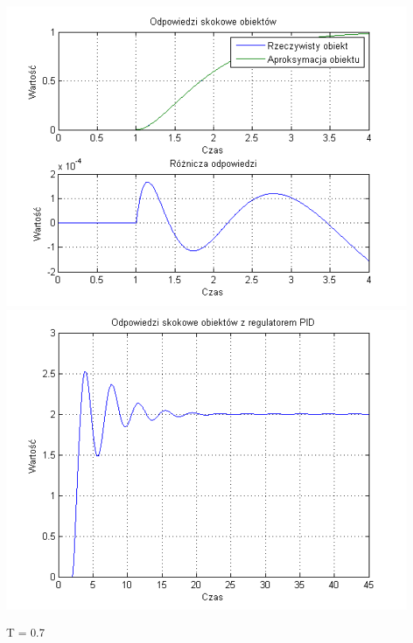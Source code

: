 \documentclass[10pt,a4paper]{article}
\begin{document}
\begin{center}
\includegraphics[scale=1]{images/dwa/skrypt_55.png}\\
\includegraphics[scale=1]{images/dwa/skrypt_56.png}\\
\end{center}
\newpage
T = 0.7
\end{document}
